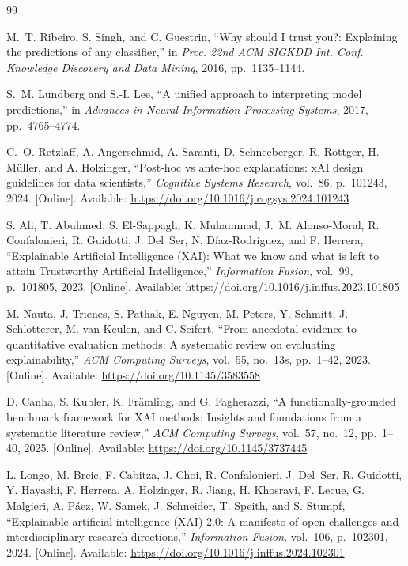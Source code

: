 \documentclass{cleiej}
\begin{document}
\begin{thebibliography}{99}

M.~T. Ribeiro, S. Singh, and C. Guestrin, ``Why should I trust you?:
Explaining the predictions of any classifier,'' in \emph{Proc. 22nd ACM
SIGKDD Int. Conf. Knowledge Discovery and Data Mining}, 2016,
pp.~1135--1144.

S.~M. Lundberg and S.-I. Lee, ``A unified approach to interpreting model
predictions,'' in \emph{Advances in Neural Information Processing Systems},
2017, pp.~4765--4774.

C.~O. Retzlaff, A. Angerschmid, A. Saranti, D. Schneeberger, R. R\"{o}ttger,
H. M\"{u}ller, and A. Holzinger, ``Post-hoc vs ante-hoc explanations: xAI
design guidelines for data scientists,'' \emph{Cognitive Systems Research},
vol.~86, p.~101243, 2024. [Online]. Available:
\url{https://doi.org/10.1016/j.cogsys.2024.101243}

S. Ali, T. Abuhmed, S. El-Sappagh, K. Muhammad, J.~M. Alonso-Moral,
R. Confalonieri, R. Guidotti, J. Del~Ser, N. D\'{i}az-Rodr\'{i}guez, and
F. Herrera, ``Explainable Artificial Intelligence (XAI): What we know and
what is left to attain Trustworthy Artificial Intelligence,''
\emph{Information Fusion}, vol.~99, p.~101805, 2023. [Online]. Available:
\url{https://doi.org/10.1016/j.inffus.2023.101805}

M. Nauta, J. Trienes, S. Pathak, E. Nguyen, M. Peters, Y. Schmitt,
J. Schl\"{o}tterer, M. van Keulen, and C. Seifert, ``From anecdotal evidence
to quantitative evaluation methods: A systematic review on evaluating
explainability,'' \emph{ACM Computing Surveys}, vol.~55, no.~13s,
pp.~1--42, 2023. [Online]. Available:
\url{https://doi.org/10.1145/3583558}

D. Canha, S. Kubler, K. Fr\"{a}mling, and G. Fagherazzi, ``A
functionally-grounded benchmark framework for XAI methods: Insights and
foundations from a systematic literature review,'' \emph{ACM Computing
Surveys}, vol.~57, no.~12, pp.~1--40, 2025. [Online]. Available:
\url{https://doi.org/10.1145/3737445}

L. Longo, M. Brcic, F. Cabitza, J. Choi, R. Confalonieri, J. Del~Ser,
R. Guidotti, Y. Hayashi, F. Herrera, A. Holzinger, R. Jiang, H. Khosravi,
F. Lecue, G. Malgieri, A. P\'{a}ez, W. Samek, J. Schneider, T. Speith, and
S. Stumpf, ``Explainable artificial intelligence (XAI) 2.0: A manifesto of
open challenges and interdisciplinary research directions,''
\emph{Information Fusion}, vol.~106, p.~102301, 2024. [Online]. Available:
\url{https://doi.org/10.1016/j.inffus.2024.102301}


\end{thebibliography}
\end{document}
